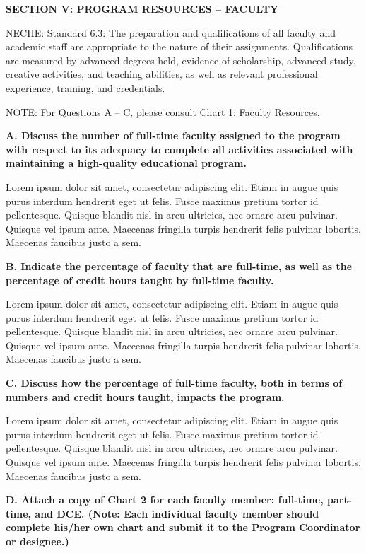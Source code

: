 \textbf{SECTION V: PROGRAM RESOURCES – FACULTY}

NECHE:  Standard 6.3: The preparation and qualifications of all faculty and academic staff are appropriate to the nature of their assignments. Qualifications are measured by advanced degrees held, evidence of scholarship, advanced study, creative activities, and teaching abilities, as well as relevant professional experience, training, and credentials.

NOTE: For Questions A – C, please consult Chart 1: Faculty Resources.

\textbf{A. Discuss the number of full-time faculty assigned to the program with respect to its adequacy to complete all activities associated with maintaining a high-quality educational program. }

Lorem ipsum dolor sit amet, consectetur adipiscing elit. Etiam in augue quis purus interdum hendrerit eget ut felis. Fusce maximus pretium tortor id pellentesque. Quisque blandit nisl in arcu ultricies, nec ornare arcu pulvinar. Quisque vel ipsum ante. Maecenas fringilla turpis hendrerit felis pulvinar lobortis. Maecenas faucibus justo a sem. 

\textbf{B. Indicate the percentage of faculty that are full-time, as well as the percentage of credit hours taught by full-time faculty. }

Lorem ipsum dolor sit amet, consectetur adipiscing elit. Etiam in augue quis purus interdum hendrerit eget ut felis. Fusce maximus pretium tortor id pellentesque. Quisque blandit nisl in arcu ultricies, nec ornare arcu pulvinar. Quisque vel ipsum ante. Maecenas fringilla turpis hendrerit felis pulvinar lobortis. Maecenas faucibus justo a sem. 

\textbf{C. Discuss how the percentage of full-time faculty, both in terms of numbers and credit hours taught, impacts the program.}


Lorem ipsum dolor sit amet, consectetur adipiscing elit. Etiam in augue quis purus interdum hendrerit eget ut felis. Fusce maximus pretium tortor id pellentesque. Quisque blandit nisl in arcu ultricies, nec ornare arcu pulvinar. Quisque vel ipsum ante. Maecenas fringilla turpis hendrerit felis pulvinar lobortis. Maecenas faucibus justo a sem. 

\textbf{D. Attach a copy of Chart 2 for each faculty member: full-time, part-time, and DCE. (Note: Each individual faculty member should complete his/her own chart and submit it to the Program Coordinator or designee.) }
